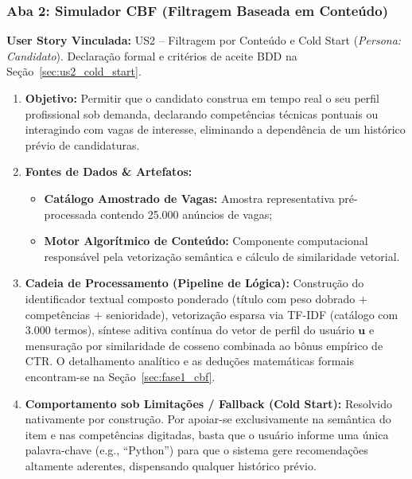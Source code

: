 \subsubsection{Aba 2: Simulador CBF (Filtragem Baseada em Conteúdo)}

\noindent\textbf{User Story Vinculada:} US2 -- Filtragem por Conteúdo e Cold Start (\textit{Persona: Candidato}).
Declaração formal e critérios de aceite BDD na Seção~\ref{sec:us2_cold_start}.

\begin{enumerate}[label=\textbf{\arabic*.}]
    \item \textbf{Objetivo:} Permitir que o candidato construa em tempo real o seu perfil profissional sob demanda, declarando competências técnicas pontuais ou interagindo com vagas de interesse, eliminando a dependência de um histórico prévio de candidaturas.
    \item \textbf{Fontes de Dados \& Artefatos:}
    \begin{itemize}
        \item \textbf{Catálogo Amostrado de Vagas:} Amostra representativa pré-processada contendo 25.000 anúncios de vagas;
        \item \textbf{Motor Algorítmico de Conteúdo:} Componente computacional responsável pela vetorização semântica e cálculo de similaridade vetorial.
    \end{itemize}
    \item \textbf{Cadeia de Processamento (Pipeline de Lógica):}
    Construção do identificador textual composto ponderado (título com peso dobrado $+$ competências $+$ senioridade), vetorização esparsa via TF-IDF (catálogo com 3.000 termos), síntese aditiva contínua do vetor de perfil do usuário $\mathbf{u}$ e mensuração por similaridade de cosseno combinada ao bônus empírico de CTR. O detalhamento analítico e as deduções matemáticas formais encontram-se na Seção~\ref{sec:fase1_cbf}.
    \item \textbf{Comportamento sob Limitações / Fallback (Cold Start):} Resolvido nativamente por construção. Por apoiar-se exclusivamente na semântica do item e nas competências digitadas, basta que o usuário informe uma única palavra-chave (e.g., ``Python'') para que o sistema gere recomendações altamente aderentes, dispensando qualquer histórico prévio.
\end{enumerate}

